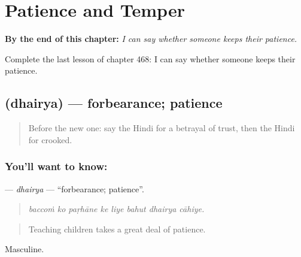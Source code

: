 
\chapter{Patience and Temper}
\label{ch:hi-patience-and-temper}

\begin{chapteropening}
\textbf{By the end of this chapter:} \emph{I can say whether someone keeps their patience.}

Complete the last lesson of chapter 468: I can say whether someone keeps their patience.
\end{chapteropening}

\section[\texorpdfstring{\hi{धैर्य} (dhairya)}{धैर्य (dhairya)}]{ (dhairya) — forbearance; patience}

\label{lesson:HI-C468-dhairya}



\begin{quote}
Before the new one: say the Hindi for a betrayal of trust, then the Hindi for crooked.
\end{quote}

\subsection*{You'll want to know: }
\textbf{} — \emph{dhairya} — \textquotedblleft{}forbearance; patience\textquotedblright{}.

\begin{quote}
       
\end{quote}

\begin{quote}
\emph{baccoṁ ko paṛhāne ke liye bahut dhairya cāhiye.}
\end{quote}

\begin{quote}
Teaching children takes a great deal of patience.
\end{quote}

Masculine.

